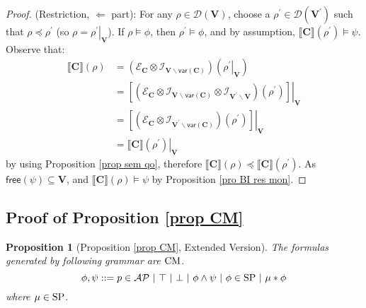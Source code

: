 \documentclass[conference,compsoc, 10pt]{IEEEtran}
\newtheorem{proposition}{Proposition}[section]
\newcommand {\cD } {{\mathcal{D}}}
\newcommand {\cE } {{\mathcal{E}}}
\newcommand {\cI } {{\mathcal{I}}}
\newcommand {\free }[1] {{\mathsf{free}\left(#1\right)}}
\newcommand {\rt }[2] {{\left.{#1}\right|_{#2}}}
\newcommand {\vars } {\mathbf{V}}
\newcommand {\var } {\mathsf{var}}
\newcommand {\prog } {{\mathbf{C}}}
\newcommand {\sem}[1] {\llbracket#1\rrbracket}
\newcommand {\AP} {{\mathcal{AP}}}
\begin{document}
\begin{appendices}
\begin{proof}
			(Restriction, $\Leftarrow$ part): For any $\rho\in\cD(\vars)$, choose a $\rho^\prime\in\cD(\vars^\prime)$ such that $\rho\preceq\rho^\prime$ (so $\rho = \rt{\rho^\prime}{\vars}$). If $\rho\models\phi$, then $\rho^\prime\models\phi$, and by assumption, 
			$\sem{\prog}(\rho^\prime)\models\psi$. Observe that:
			\begin{align*}
			\sem{\prog}(\rho) &= 
			(\cE_\prog\otimes\cI_{\vars\backslash\var(\prog)})(\rt{\rho^\prime}{\vars}) \\
			&= \rt{\left[(\cE_\prog\otimes\cI_{\vars\backslash\var(\prog)}\otimes\cI_{\vars^\prime\backslash\vars})(\rho^\prime)\right]}{\vars} \\
			&= \rt{\left[(\cE_\prog\otimes\cI_{\vars^\prime\backslash\var(\prog)})(\rho^\prime)\right]}{\vars} \\
			&= \rt{\sem{\prog}(\rho^\prime)}{\vars}
			\end{align*}
			by using Proposition \ref{prop sem qo}, therefore $\sem{\prog}(\rho)\preceq\sem{\prog}(\rho^\prime)$. As $\free{\psi}\subseteq\vars$, and $\sem{\prog}(\rho)\models\psi$  by Proposition \ref{pro BI res mon}.
		\end{proof}
		
		
		
		
		
		\subsection{Proof of Proposition \ref{prop CM}}
		
		\begin{proposition}[Proposition \ref{prop CM}, Extended Version] The formulas generated by following grammar are ${\rm CM}$. 
			$$
			\phi,\psi ::= p\in\AP\ |\ \top\ |\ \bot\ |\ \phi\wedge\psi\ |\ \phi\in{\rm SP}\ |\ \mu\ast\phi
			$$
			where $\mu\in {\rm SP}$.
		\end{proposition}
		

\end{appendices}
\end{document}
